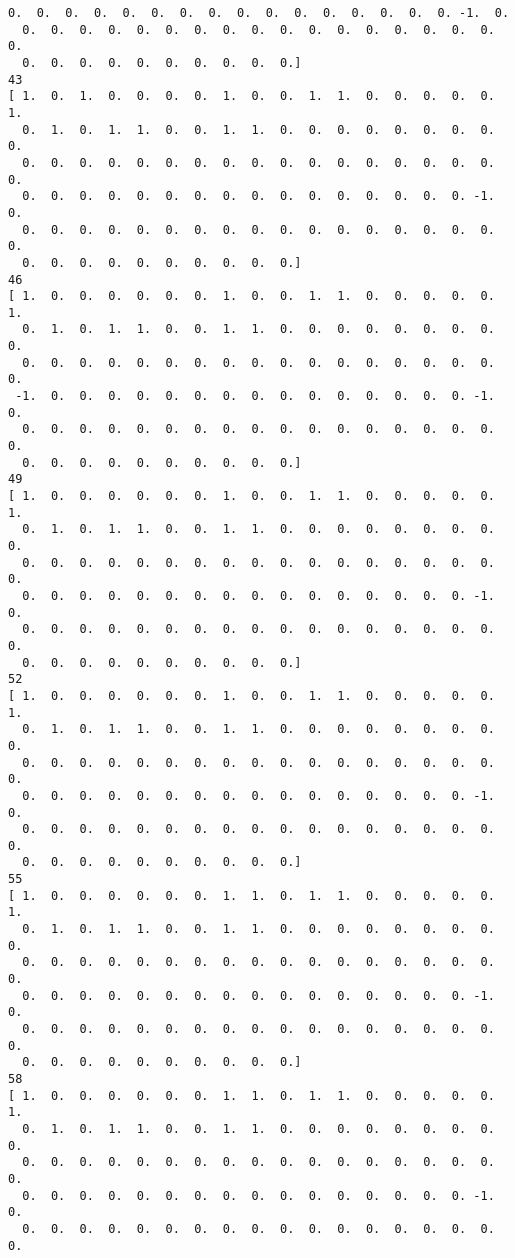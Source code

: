 \documentclass[11pt]{article}
\begin{document}
\begin{Verbatim}[commandchars=\\\{\}]
  0.  0.  0.  0.  0.  0.  0.  0.  0.  0.  0.  0.  0.  0.  0.  0. -1.  0.
  0.  0.  0.  0.  0.  0.  0.  0.  0.  0.  0.  0.  0.  0.  0.  0.  0.  0.
  0.  0.  0.  0.  0.  0.  0.  0.  0.  0.]
43
[ 1.  0.  1.  0.  0.  0.  0.  1.  0.  0.  1.  1.  0.  0.  0.  0.  0.  1.
  0.  1.  0.  1.  1.  0.  0.  1.  1.  0.  0.  0.  0.  0.  0.  0.  0.  0.
  0.  0.  0.  0.  0.  0.  0.  0.  0.  0.  0.  0.  0.  0.  0.  0.  0.  0.
  0.  0.  0.  0.  0.  0.  0.  0.  0.  0.  0.  0.  0.  0.  0.  0. -1.  0.
  0.  0.  0.  0.  0.  0.  0.  0.  0.  0.  0.  0.  0.  0.  0.  0.  0.  0.
  0.  0.  0.  0.  0.  0.  0.  0.  0.  0.]
46
[ 1.  0.  0.  0.  0.  0.  0.  1.  0.  0.  1.  1.  0.  0.  0.  0.  0.  1.
  0.  1.  0.  1.  1.  0.  0.  1.  1.  0.  0.  0.  0.  0.  0.  0.  0.  0.
  0.  0.  0.  0.  0.  0.  0.  0.  0.  0.  0.  0.  0.  0.  0.  0.  0.  0.
 -1.  0.  0.  0.  0.  0.  0.  0.  0.  0.  0.  0.  0.  0.  0.  0. -1.  0.
  0.  0.  0.  0.  0.  0.  0.  0.  0.  0.  0.  0.  0.  0.  0.  0.  0.  0.
  0.  0.  0.  0.  0.  0.  0.  0.  0.  0.]
49
[ 1.  0.  0.  0.  0.  0.  0.  1.  0.  0.  1.  1.  0.  0.  0.  0.  0.  1.
  0.  1.  0.  1.  1.  0.  0.  1.  1.  0.  0.  0.  0.  0.  0.  0.  0.  0.
  0.  0.  0.  0.  0.  0.  0.  0.  0.  0.  0.  0.  0.  0.  0.  0.  0.  0.
  0.  0.  0.  0.  0.  0.  0.  0.  0.  0.  0.  0.  0.  0.  0.  0. -1.  0.
  0.  0.  0.  0.  0.  0.  0.  0.  0.  0.  0.  0.  0.  0.  0.  0.  0.  0.
  0.  0.  0.  0.  0.  0.  0.  0.  0.  0.]
52
[ 1.  0.  0.  0.  0.  0.  0.  1.  0.  0.  1.  1.  0.  0.  0.  0.  0.  1.
  0.  1.  0.  1.  1.  0.  0.  1.  1.  0.  0.  0.  0.  0.  0.  0.  0.  0.
  0.  0.  0.  0.  0.  0.  0.  0.  0.  0.  0.  0.  0.  0.  0.  0.  0.  0.
  0.  0.  0.  0.  0.  0.  0.  0.  0.  0.  0.  0.  0.  0.  0.  0. -1.  0.
  0.  0.  0.  0.  0.  0.  0.  0.  0.  0.  0.  0.  0.  0.  0.  0.  0.  0.
  0.  0.  0.  0.  0.  0.  0.  0.  0.  0.]
55
[ 1.  0.  0.  0.  0.  0.  0.  1.  1.  0.  1.  1.  0.  0.  0.  0.  0.  1.
  0.  1.  0.  1.  1.  0.  0.  1.  1.  0.  0.  0.  0.  0.  0.  0.  0.  0.
  0.  0.  0.  0.  0.  0.  0.  0.  0.  0.  0.  0.  0.  0.  0.  0.  0.  0.
  0.  0.  0.  0.  0.  0.  0.  0.  0.  0.  0.  0.  0.  0.  0.  0. -1.  0.
  0.  0.  0.  0.  0.  0.  0.  0.  0.  0.  0.  0.  0.  0.  0.  0.  0.  0.
  0.  0.  0.  0.  0.  0.  0.  0.  0.  0.]
58
[ 1.  0.  0.  0.  0.  0.  0.  1.  1.  0.  1.  1.  0.  0.  0.  0.  0.  1.
  0.  1.  0.  1.  1.  0.  0.  1.  1.  0.  0.  0.  0.  0.  0.  0.  0.  0.
  0.  0.  0.  0.  0.  0.  0.  0.  0.  0.  0.  0.  0.  0.  0.  0.  0.  0.
  0.  0.  0.  0.  0.  0.  0.  0.  0.  0.  0.  0.  0.  0.  0.  0. -1.  0.
  0.  0.  0.  0.  0.  0.  0.  0.  0.  0.  0.  0.  0.  0.  0.  0.  0.  0.

\end{Verbatim}
\end{document}

